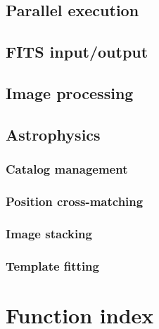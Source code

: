 \documentclass[12pt]{report}
\begin{document}
\section{Parallel execution}

\section{FITS input/output}

\section{Image processing}

\section{Astrophysics}

\subsection{Catalog management}

\subsection{Position cross-matching}

\subsection{Image stacking}

\subsection{Template fitting}

\chapter{Function index}
\end{document}

